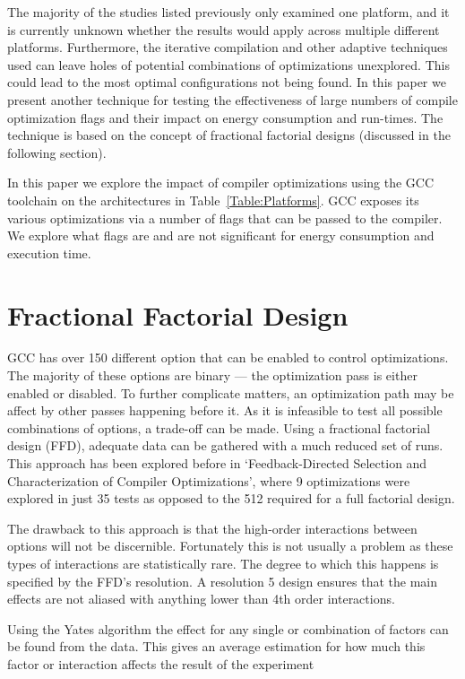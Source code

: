 \documentclass[twocolumn]{article}
\newcommand{\nsection}[1]{\section{\bfseries #1}}
\begin{document}
The majority of the studies listed previously only examined one platform, and it is currently unknown whether the results would apply across multiple different platforms. Furthermore, the iterative compilation and other adaptive techniques used can leave holes of potential combinations of optimizations unexplored. This could lead to the most optimal configurations not being found. In this paper we present another technique for testing the effectiveness of large numbers of compile optimization flags and their impact on energy consumption and run-times. The technique is based on the concept of fractional factorial designs (discussed in the following section).

In this paper we explore the impact of compiler optimizations using the GCC toolchain on the architectures in Table~\ref{Table:Platforms}. GCC exposes its various optimizations via a number of flags that can be passed to the compiler. We explore what flags are and are not significant for energy consumption and execution time.

\nsection{Fractional Factorial Design}

GCC has over 150 different option that can be enabled to control optimizations. The majority of these options are binary --- the optimization pass is either enabled or disabled. To further complicate matters, an optimization path may be affect by other passes happening before it. As it is infeasible to test all possible combinations of options, a trade-off can be made. Using a fractional factorial design (FFD), adequate data can be gathered with a much reduced set of runs. This approach has been explored before in `Feedback-Directed Selection and Characterization of Compiler Optimizations'\cite{IntelPaper}, where 9 optimizations were explored in just 35 tests as opposed to the 512 required for a full factorial design.

The drawback to this approach is that the high-order interactions between options will not be discernible. Fortunately this is not usually a problem as these types of interactions are statistically rare. The degree to which this happens is specified by the FFD's resolution\cite{BoxHunter}. A resolution 5 design ensures that the main effects are not aliased with anything lower than 4th order interactions.

Using the Yates algorithm the effect for any single or combination of factors can be found from the data. This gives an average estimation for how much this factor or interaction affects the result of the experiment
\end{document}
